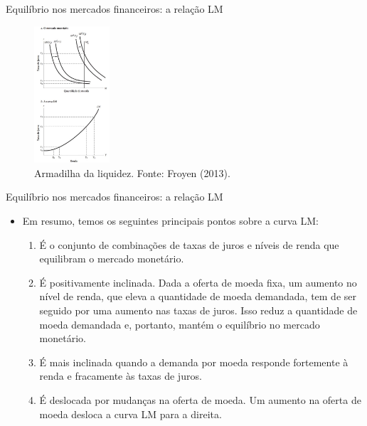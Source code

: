 \documentclass[10pt]{beamer}
\begin{document}
\begin{frame}{Equilíbrio nos mercados financeiros: a relação LM}
\begin{figure}
    \centering
    \includegraphics[width=0.25\textwidth]{./figures/aula092_fig7.JPG}
    \caption{Armadilha da liquidez. Fonte: Froyen (2013).}
    \label{fig7}
\end{figure}
\end{frame}

\begin{frame}{Equilíbrio nos mercados financeiros: a relação LM}
\begin{itemize}
    \item Em resumo, temos os seguintes principais pontos sobre a curva LM:
    \bigskip
    \begin{enumerate}
        \item É o conjunto de combinações de taxas de juros e níveis de renda que equilibram o mercado monetário.
        \bigskip
        \item É positivamente inclinada. Dada a oferta de moeda fixa, um aumento no nível de renda, que eleva a quantidade de moeda demandada, tem de ser seguido por uma aumento nas taxas de juros. Isso reduz a quantidade de moeda demandada e, portanto, mantém o equilíbrio no mercado monetário.
        \bigskip
        \item É mais inclinada quando a demanda por moeda responde fortemente à renda e fracamente às taxas de juros.
        \bigskip
        \item É deslocada por mudanças na oferta de moeda. Um aumento na oferta de moeda desloca a curva LM para a direita.
    \end{enumerate}
\end{itemize}
\end{frame}
\end{document}
